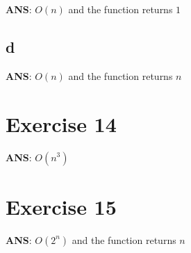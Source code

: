 \documentclass[
]{article}
\begin{document}
\textbf{ANS}: \(O(n)\) and the function returns \(1\)

\hypertarget{d-2}{%
\subsection{d}\label{d-2}}

\textbf{ANS}: \(O(n)\) and the function returns \(n\)

\hypertarget{exercise-14}{%
\section{Exercise 14}\label{exercise-14}}

\textbf{ANS}: \(O(n^3)\)

\hypertarget{exercise-15}{%
\section{Exercise 15}\label{exercise-15}}

\textbf{ANS}: \(O(2^n)\) and the function returns \(n\)
\end{document}
